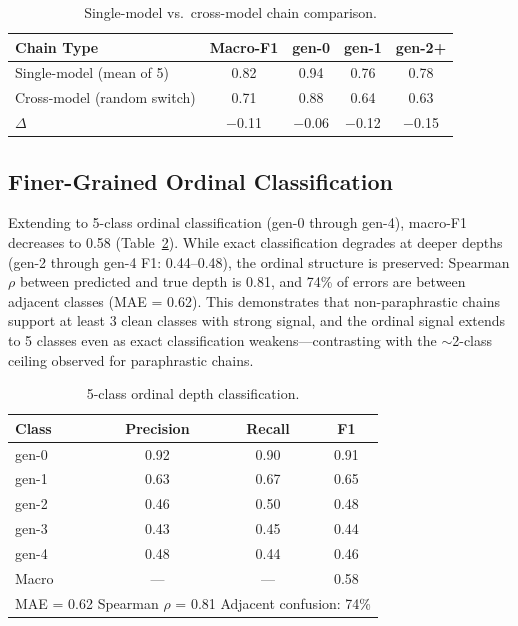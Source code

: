 \documentclass[letterpaper]{article}
\begin{document}
\begin{table}[t]
\centering
\caption{Single-model vs.\ cross-model chain comparison.}
\label{tab:crossmodel}
\begin{tabular}{lcccc}
\toprule
Chain Type & Macro-F1 & gen-0 & gen-1 & gen-2+ \\
\midrule
Single-model (mean of 5) & 0.82 & 0.94 & 0.76 & 0.78 \\
Cross-model (random switch) & 0.71 & 0.88 & 0.64 & 0.63 \\
$\Delta$ & $-$0.11 & $-$0.06 & $-$0.12 & $-$0.15 \\
\bottomrule
\end{tabular}
\end{table}

\subsection{Finer-Grained Ordinal Classification}

Extending to 5-class ordinal classification (gen-0 through gen-4), macro-F1 decreases to 0.58 (Table~\ref{tab:ordinal}).
While exact classification degrades at deeper depths (gen-2 through gen-4 F1: 0.44--0.48), the ordinal structure is preserved: Spearman $\rho$ between predicted and true depth is 0.81, and 74\% of errors are between adjacent classes (MAE = 0.62).
This demonstrates that non-paraphrastic chains support at least 3 clean classes with strong signal, and the ordinal signal extends to 5 classes even as exact classification weakens---contrasting with the ${\sim}$2-class ceiling observed for paraphrastic chains.

\begin{table}[t]
\centering
\caption{5-class ordinal depth classification.}
\label{tab:ordinal}
\begin{tabular}{lccc}
\toprule
Class & Precision & Recall & F1 \\
\midrule
gen-0 & 0.92 & 0.90 & 0.91 \\
gen-1 & 0.63 & 0.67 & 0.65 \\
gen-2 & 0.46 & 0.50 & 0.48 \\
gen-3 & 0.43 & 0.45 & 0.44 \\
gen-4 & 0.48 & 0.44 & 0.46 \\
\midrule
Macro & --- & --- & 0.58 \\
\bottomrule
\multicolumn{4}{l}{MAE = 0.62 \quad Spearman $\rho$ = 0.81 \quad Adjacent confusion: 74\%}
\end{tabular}
\end{table}
\end{document}

